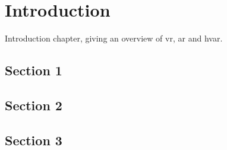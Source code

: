 \chapter{Introduction}
\label{ch:introduction}

Introduction chapter, giving an overview of \acrfull{vr}, \acrfull{ar} and \acrfull{hvar}. 

\section{Section 1}

\section{Section 2}

\section{Section 3}